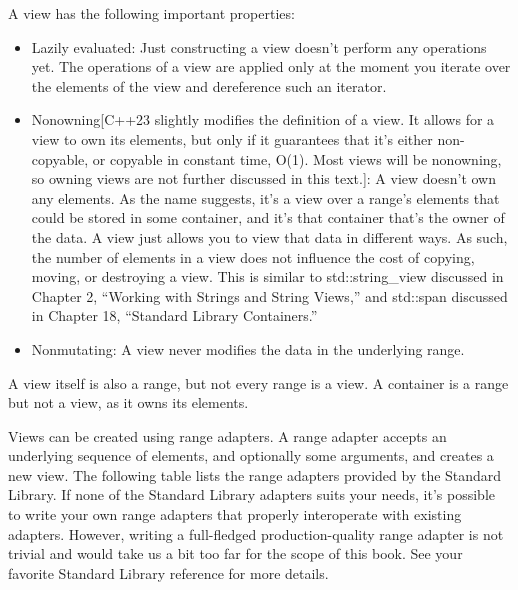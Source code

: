 A view has the following important properties:

\begin{itemize}
\item
Lazily evaluated: Just constructing a view doesn’t perform any operations yet. The operations of a view are applied only at the moment you iterate over the elements of the view and dereference such an iterator.

\item
Nonowning[C++23 slightly modifies the definition of a view. It allows for a view to own its elements, but only if it guarantees that it’s either non-copyable, or copyable in constant time, O(1). Most views will be nonowning, so owning views are not further discussed in this text.]: A view doesn’t own any elements. As the name suggests, it’s a view over a range’s elements that could be stored in some container, and it’s that container that’s the owner of the data. A view just allows you to view that data in different ways. As such, the number of elements in a view does not influence the cost of copying, moving, or destroying a view. This is similar to std::string\_view discussed in Chapter 2, “Working with Strings and String Views,” and std::span discussed in Chapter 18, “Standard Library Containers.”

\item
Nonmutating: A view never modifies the data in the underlying range.
\end{itemize}

A view itself is also a range, but not every range is a view. A container is a range but not a view, as it owns its elements.

Views can be created using range adapters. A range adapter accepts an underlying sequence of elements, and optionally some arguments, and creates a new view. The following table lists the range adapters provided by the Standard Library. If none of the Standard Library adapters suits your needs, it’s possible to write your own range adapters that properly interoperate with existing adapters. However, writing a full-fledged production-quality range adapter is not trivial and would take us a bit too far for the scope of this book. See your favorite Standard Library reference for more details.

